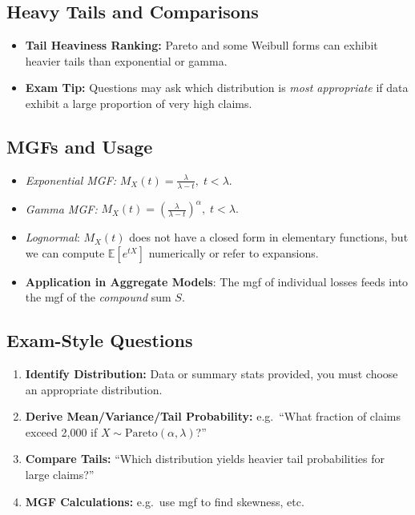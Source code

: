 \documentclass[13pt,a4paper]{article}
\begin{document}
\subsection{Heavy Tails and Comparisons}
\begin{itemize}
  \item \textbf{Tail Heaviness Ranking:} Pareto and some Weibull forms can exhibit heavier tails than exponential or gamma.
  \item \textbf{Exam Tip:} Questions may ask which distribution is \emph{most appropriate} if data exhibit a large proportion of very high claims.
\end{itemize}

\subsection{MGFs and Usage}
\begin{itemize}
  \item \emph{Exponential MGF:} \(M_X(t)=\frac{\lambda}{\lambda - t}, \; t<\lambda.\)
  \item \emph{Gamma MGF:} \(M_X(t)=\left(\frac{\lambda}{\lambda - t}\right)^\alpha, \; t<\lambda.\)
  \item \emph{Lognormal}: \(M_X(t)\) does not have a closed form in elementary functions, but we can compute \(\mathbb{E}[e^{tX}]\) numerically or refer to expansions.
  \item \textbf{Application in Aggregate Models}: The mgf of individual losses feeds into the mgf of the \emph{compound} sum \(S\). 
\end{itemize}

\subsection{Exam-Style Questions}
\begin{enumerate}
  \item \textbf{Identify Distribution:} Data or summary stats provided, you must choose an appropriate distribution. 
  \item \textbf{Derive Mean/Variance/Tail Probability:} e.g.\ “What fraction of claims exceed 2,000 if \(X\sim\text{Pareto}(\alpha,\lambda)\)?”
  \item \textbf{Compare Tails:} “Which distribution yields heavier tail probabilities for large claims?” 
  \item \textbf{MGF Calculations:} e.g.\ use mgf to find skewness, etc.
\end{enumerate}
\end{document}
